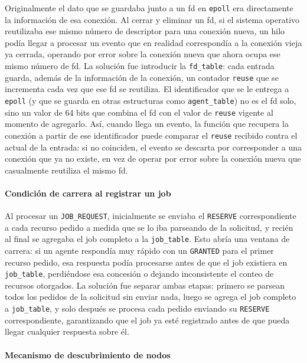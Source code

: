\documentclass[a4paper,10pt]{article}
\begin{document}
Originalmente el dato que se guardaba junto a un fd en \texttt{epoll} era directamente la información de esa conexión. Al cerrar y eliminar un fd, si el sistema operativo reutilizaba ese mismo número de descriptor para una conexión nueva, un hilo podía llegar a procesar un evento que en realidad correspondía a la conexión vieja ya cerrada, operando por error sobre la conexión nueva que ahora ocupa ese mismo número de fd. La solución fue introducir la \texttt{fd\_table}: cada entrada guarda, además de la información de la conexión, un contador \texttt{reuse} que se incrementa cada vez que ese fd se reutiliza. El identificador que se le entrega a \texttt{epoll} (y que se guarda en otras estructuras como \texttt{agent\_table}) no es el fd solo, sino un valor de 64 bits que combina el fd con el valor de \texttt{reuse} vigente al momento de agregarlo. Así, cuando llega un evento, la función que recupera la conexión a partir de ese identificador puede comparar el \texttt{reuse} recibido contra el actual de la entrada: si no coinciden, el evento se descarta por corresponder a una conexión que ya no existe, en vez de operar por error sobre la conexión nueva que casualmente reutiliza el mismo fd.

\paragraph{Condición de carrera al registrar un job}

Al procesar un \texttt{JOB\_REQUEST}, inicialmente se enviaba el \texttt{RESERVE} correspondiente a cada recurso pedido a medida que se lo iba parseando de la solicitud, y recién al final se agregaba el job completo a la \texttt{job\_table}. Esto abría una ventana de carrera: si un agente respondía muy rápido con un \texttt{GRANTED} para el primer recurso pedido, esa respuesta podía procesarse antes de que el job existiera en \texttt{job\_table}, perdiéndose esa concesión o dejando inconsistente el conteo de recursos otorgados. La solución fue separar ambas etapas: primero se parsean todos los pedidos de la solicitud sin enviar nada, luego se agrega el job completo a \texttt{job\_table}, y solo después se procesa cada pedido enviando su \texttt{RESERVE} correspondiente, garantizando que el job ya esté registrado antes de que pueda llegar cualquier respuesta sobre él.

\paragraph{Mecanismo de descubrimiento de nodos}
\end{document}
